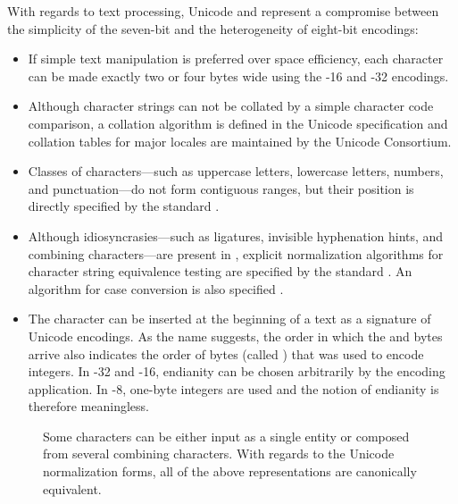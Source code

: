 \documentclass[
  a5paper,10pt,           %
  dvipsnames              %
]{book}
\begin{document}
With regards to text processing, Unicode and  represent a
compromise between the simplicity of the seven-bit  and the
heterogeneity of eight-bit encodings:
\begin{itemize}
  \item If simple text manipulation is preferred over space efficiency, each
    character can be made exactly two or four bytes wide using the
    -16 and -32 encodings.
  \item Although character strings can not be collated by a simple character
    code comparison, a collation algorithm is defined in the Unicode
    specification \cite{unicode15:collation} and collation tables for major
    locales \cite{unicode15:cldr} are maintained by the Unicode Consortium.
  \item Classes of characters---such as uppercase letters, lowercase letters,
    numbers, and punctuation---do not form contiguous ranges, but their position
    is directly specified by the standard \cite[sec.\,4.5]{unicode15}.
  \item Although idiosyncrasies---such as ligatures, invisible hyphenation
    hints, and combining characters---are present in , explicit
    normalization algorithms for character string equivalence testing are
    specified by the standard \cite[sec.\,2.12]{unicode15}. An algorithm
    for case conversion is also specified \cite[sec.\,3.13]{unicode15}.
  \item The  character can be inserted at the
    beginning of a text as a signature of Unicode encodings. As the name
    suggests, the order in which the  and  bytes arrive also
    indicates the order of bytes (called ) that was used to
    encode integers. In -32 and -16, endianity
    can be chosen arbitrarily by the encoding application. In -8,
    one-byte integers are used and the notion of endianity is therefore
    meaningless.
\end{itemize}

\begin{figure}
  
  \caption{Some  characters can be either input as a single
    entity or composed from several combining characters. With regards to the
    Unicode normalization forms, all of the above representations are
    canonically equivalent.}
\end{figure}
\end{document}
